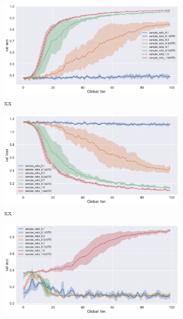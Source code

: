 \begin{figure}[ht]
\begin{subfigure}{.5\textwidth}
  \centering
  \includegraphics[width=.95\linewidth]{figures/proxskip-compare-sample-ratio-val-acc.pdf}
  \caption{xx}
  \label{fig:proxskip-compare-sample-ratio-val-acc}
\end{subfigure}%
\begin{subfigure}{.5\textwidth}
  \centering
  \includegraphics[width=.95\linewidth]{figures/proxskip-compare-sample-ratio-val-loss.pdf}
  \caption{xx}
  \label{fig:proxskip-compare-sample-ratio-val-loss}
\end{subfigure}
\begin{subfigure}{.5\textwidth}
  \centering
  \includegraphics[width=.95\linewidth]{figures/fedsplit-compare-sample-ratio-val-acc.pdf}

\end{subfigure}
\end{figure}
